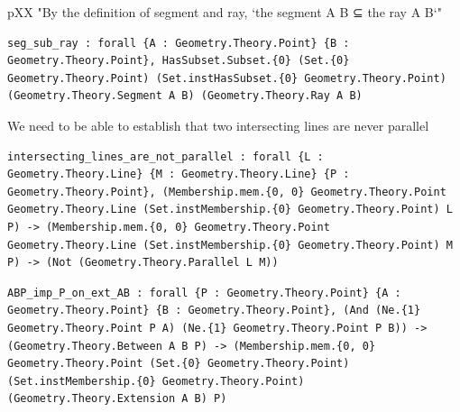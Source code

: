 \begin{theorem}
  \label{Geometry.Theory.Line.seg_sub_ray}
  \leanok
  pXX "By the definition of segment and ray, `the segment A B ⊆ the ray A B`" 
\begin{verbatim}seg_sub_ray : forall {A : Geometry.Theory.Point} {B : Geometry.Theory.Point}, HasSubset.Subset.{0} (Set.{0} Geometry.Theory.Point) (Set.instHasSubset.{0} Geometry.Theory.Point) (Geometry.Theory.Segment A B) (Geometry.Theory.Ray A B)\end{verbatim}
\end{theorem}

\begin{theorem}
  \label{Geometry.Theory.Line.intersecting_lines_are_not_parallel}
  \leanok
  We need to be able to establish that two intersecting lines are never parallel 
\begin{verbatim}intersecting_lines_are_not_parallel : forall {L : Geometry.Theory.Line} {M : Geometry.Theory.Line} {P : Geometry.Theory.Point}, (Membership.mem.{0, 0} Geometry.Theory.Point Geometry.Theory.Line (Set.instMembership.{0} Geometry.Theory.Point) L P) -> (Membership.mem.{0, 0} Geometry.Theory.Point Geometry.Theory.Line (Set.instMembership.{0} Geometry.Theory.Point) M P) -> (Not (Geometry.Theory.Parallel L M))\end{verbatim}
\end{theorem}

\begin{theorem}
  \label{Geometry.Theory.Line.ABP_imp_P_on_ext_AB}
  \leanok
\begin{verbatim}ABP_imp_P_on_ext_AB : forall {P : Geometry.Theory.Point} {A : Geometry.Theory.Point} {B : Geometry.Theory.Point}, (And (Ne.{1} Geometry.Theory.Point P A) (Ne.{1} Geometry.Theory.Point P B)) -> (Geometry.Theory.Between A B P) -> (Membership.mem.{0, 0} Geometry.Theory.Point (Set.{0} Geometry.Theory.Point) (Set.instMembership.{0} Geometry.Theory.Point) (Geometry.Theory.Extension A B) P)\end{verbatim}
\end{theorem}

